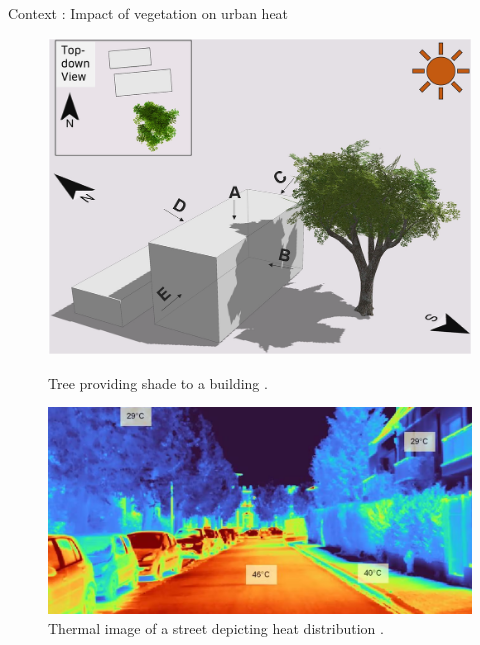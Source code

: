 \documentclass[10pt]{beamer}
\begin{document}
\begin{frame}{Context : Impact of vegetation on urban heat}
  \begin{figure}[H]
    \centering
    \begin{minipage}{0.49\textwidth}
        \centering
        \includegraphics[width=\textwidth]{images/TreeShade.png}
        \caption{Tree providing shade to a building \cite{img:TreeShade}.}
    \end{minipage}\hfill
    \begin{minipage}{0.49\textwidth}
        \centering
        \includegraphics[width=\textwidth]{images/heat_street.png}
        \caption{Thermal image of a street depicting heat distribution \cite{img:street_thermography}.}
    \end{minipage}
  \end{figure}
\end{frame}
\end{document}
